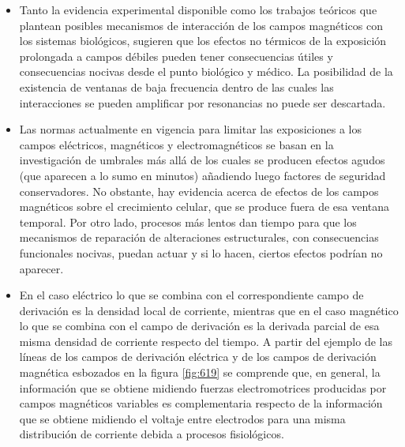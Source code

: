 \begin{itemize}
	\item Tanto la evidencia experimental disponible como los trabajos teóricos que plantean posibles mecanismos de interacción de los campos magnéticos con los sistemas biológicos, sugieren que los efectos no térmicos de la exposición prolongada a campos débiles pueden tener consecuencias útiles y consecuencias nocivas desde el punto biológico y médico. La posibilidad de la existencia de ventanas de baja frecuencia dentro de las cuales las interacciones se pueden amplificar por resonancias no puede ser descartada.

	\item Las normas actualmente en vigencia para limitar las exposiciones a los campos eléctricos, magnéticos y electromagnéticos se basan en la investigación de umbrales más allá de los cuales se producen efectos agudos (que aparecen a lo sumo en minutos) añadiendo luego factores de seguridad conservadores. No obstante, hay evidencia acerca de efectos de los campos magnéticos sobre el crecimiento celular, que se produce fuera de esa ventana temporal. Por otro lado, procesos más lentos dan tiempo para que los mecanismos de reparación de alteraciones estructurales, con consecuencias funcionales nocivas, puedan actuar y si lo hacen, ciertos efectos podrían no aparecer.

	\item En el caso eléctrico lo que se combina con el correspondiente campo de derivación es la densidad local de corriente, mientras que en el caso magnético lo que se combina con el campo de derivación es la derivada parcial de esa misma densidad de corriente respecto del tiempo. A partir del ejemplo de las líneas de los campos de derivación eléctrica y de los campos de derivación magnética esbozados en la figura \ref{fig:619} se comprende que, en general, la información que se obtiene midiendo fuerzas electromotrices producidas por campos magnéticos variables es complementaria respecto de la información que se obtiene midiendo el voltaje entre electrodos para una misma distribución de corriente debida a procesos fisiológicos.
\end{itemize}





